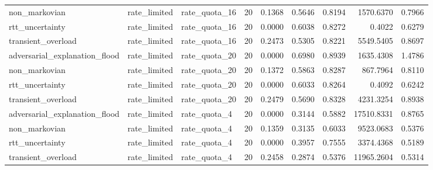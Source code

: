\begin{table}[t]
\begin{tabular}{lllrrrrrr}
non\_markovian & rate\_limited & rate\_quota\_16 & 20 & 0.1368 & 0.5646 & 0.8194 & 1570.6370 & 0.7966 \\
rtt\_uncertainty & rate\_limited & rate\_quota\_16 & 20 & 0.0000 & 0.6038 & 0.8272 & 0.4022 & 0.6279 \\
transient\_overload & rate\_limited & rate\_quota\_16 & 20 & 0.2473 & 0.5305 & 0.8221 & 5549.5405 & 0.8697 \\
adversarial\_explanation\_flood & rate\_limited & rate\_quota\_20 & 20 & 0.0000 & 0.6980 & 0.8939 & 1635.4308 & 1.4786 \\
non\_markovian & rate\_limited & rate\_quota\_20 & 20 & 0.1372 & 0.5863 & 0.8287 & 867.7964 & 0.8110 \\
rtt\_uncertainty & rate\_limited & rate\_quota\_20 & 20 & 0.0000 & 0.6033 & 0.8264 & 0.4092 & 0.6242 \\
transient\_overload & rate\_limited & rate\_quota\_20 & 20 & 0.2479 & 0.5690 & 0.8328 & 4231.3254 & 0.8938 \\
adversarial\_explanation\_flood & rate\_limited & rate\_quota\_4 & 20 & 0.0000 & 0.3144 & 0.5882 & 17510.8331 & 0.8765 \\
non\_markovian & rate\_limited & rate\_quota\_4 & 20 & 0.1359 & 0.3135 & 0.6033 & 9523.0683 & 0.5376 \\
rtt\_uncertainty & rate\_limited & rate\_quota\_4 & 20 & 0.0000 & 0.3957 & 0.7555 & 3374.4368 & 0.5189 \\
transient\_overload & rate\_limited & rate\_quota\_4 & 20 & 0.2458 & 0.2874 & 0.5376 & 11965.2604 & 0.5314 \\
\bottomrule
\end{tabular}
\end{table}
